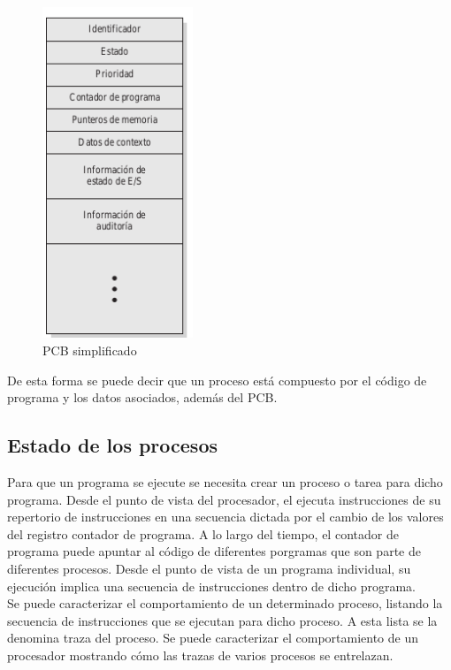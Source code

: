\documentclass{article}
\begin{document}
				\begin{figure}
				\caption{PCB simplificado}
				\label{figura2.1:pcb}
				\centering
				\includegraphics[width=0.4\textwidth, scale=1]{tema_2_figura1.png}
				\end{figure}
				
				De esta forma se puede decir que un proceso está compuesto por el código de programa y los datos asociados, además del PCB.
				
		\subsection{Estado de los procesos}
			Para que un programa se ejecute se necesita crear un proceso o tarea para dicho programa. Desde el punto de vista del procesador, el ejecuta instrucciones de su repertorio de instrucciones en una secuencia dictada por el cambio de los valores del registro contador de programa. A lo largo del tiempo, el contador de programa puede apuntar al código de diferentes porgramas que son parte de diferentes procesos. Desde el punto de vista de un programa individual, su ejecución
implica una secuencia de instrucciones dentro de dicho programa. \\
			
			Se puede caracterizar el comportamiento de un determinado proceso, listando la secuencia de instrucciones que se ejecutan para dicho proceso. A esta lista se la denomina traza del proceso. Se puede caracterizar el comportamiento de un procesador mostrando cómo las trazas de varios procesos se entrelazan. \\
			
\end{document}
